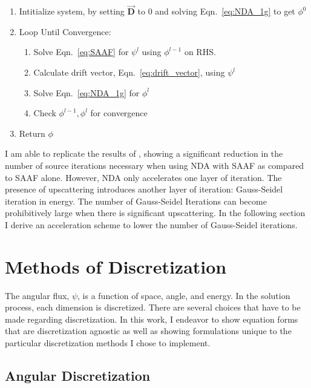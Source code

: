 \begin{enumerate}
    \item Intitialize system, by setting $\vec{\textbf{D}}$ to 0 and solving Eqn.~\eqref{eq:NDA_1g} to get $\phi^0$ 
    \item Loop Until Convergence:
        \begin{enumerate}
            \item Solve Eqn.~\eqref{eq:SAAF} for $\psi^l$ using $\phi^{l-1}$ on RHS.
            \item Calculate drift vector, Eqn.~\eqref{eq:drift_vector}, using $\psi^l$
            \item Solve Eqn.~\eqref{eq:NDA_1g} for $\phi^l$
            \item Check $\phi^{l-1}, \phi^l$ for convergence
        \end{enumerate}
    \item Return $\phi$
\end{enumerate}

I am able to replicate the results of \cite{Wang2013}, showing a significant reduction in the number of source iterations necessary when using NDA with SAAF as compared to SAAF alone. However, NDA only accelerates one layer of iteration. The presence of upscattering introduces another layer of iteration: Gauss-Seidel iteration in energy. The number of Gauss-Seidel Iterations can become prohibitively large when there is significant upscattering. In the following section I derive an acceleration scheme to lower the number of Gauss-Seidel iterations.

\section{Methods of Discretization}
The angular flux, $\psi$, is a function of space, angle, and energy. In the solution process, each dimension is discretized. There are several choices that have to be made regarding discretization. In this work, I endeavor to show equation forms that are discretization agnostic as well as showing formulations unique to the particular discretization methods I chose to implement. 

\subsection{Angular Discretization}
 
